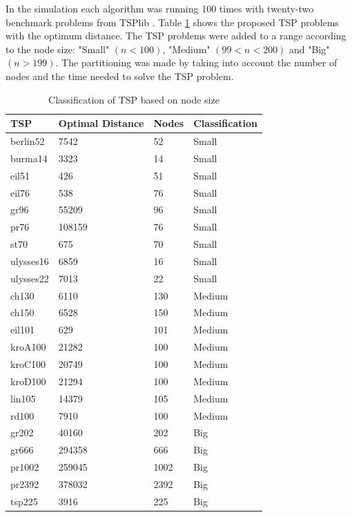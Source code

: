 \documentclass[conference]{IEEEtran}
\begin{document}
	In the simulation each algorithm was running 100 times with twenty-two benchmark problems from TSPlib \cite{tsplib2019}. Table \ref{tab:tspgroupbynodesize} shows the proposed TSP problems with the optimum distance. The TSP problems were added to a range according to the node size: "Small" $(n<100)$, "Medium" $(99<n<200)$ and "Big" $(n>199)$. The partitioning was made by taking into account the number of nodes and the time needed to solve the TSP problem. 
	\begin{table}[H]
	    \centering
	    \begin{tabular}{ | l | l | l | l | }
	         \hline
        	TSP & Optimal Distance & Nodes & Classification \\ \hline \hline
        	berlin52 & 7542 & 52 & Small \\ \hline
        	burma14 & 3323 & 14 & Small \\ \hline
        	eil51 & 426 & 51 & Small \\ \hline
        	eil76 & 538 & 76 & Small \\ \hline
        	gr96 & 55209 & 96 & Small \\ \hline
        	pr76 & 108159 & 76 & Small \\ \hline
        	st70 & 675 & 70 & Small \\ \hline
        	ulysses16 & 6859 & 16 & Small \\ \hline
        	ulysses22 & 7013 & 22 & Small \\ \hline
        	ch130 & 6110 & 130 & Medium \\ \hline
        	ch150 & 6528 & 150 & Medium \\ \hline
        	eil101 & 629 & 101 & Medium \\ \hline
        	kroA100 & 21282 & 100 & Medium \\ \hline
        	kroC100 & 20749 & 100 & Medium \\ \hline
        	kroD100 & 21294 & 100 & Medium \\ \hline
        	lin105 & 14379 & 105 & Medium \\ \hline
        	rd100 & 7910 & 100 & Medium \\ \hline
        	gr202 & 40160 & 202 & Big \\ \hline
        	gr666 & 294358 & 666 & Big \\ \hline
        	pr1002 & 259045 & 1002 & Big \\ \hline
        	pr2392 & 378032 & 2392 & Big \\ \hline
        	tsp225 & 3916 & 225 & Big \\ \hline
	    \end{tabular}
	    \caption{Classification of TSP based on node size}
	    \label{tab:tspgroupbynodesize}
	\end{table}
\end{document}
